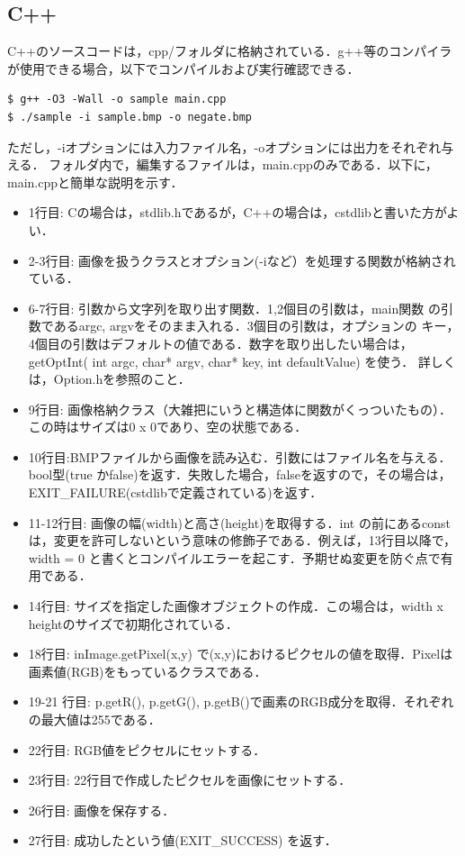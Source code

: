 ﻿\documentclass[11pt]{jsarticle}
\begin{document}
\subsection{C++}
C++のソースコードは，cpp/フォルダに格納されている．g++等のコンパイラが使用できる場合，以下でコンパイルおよび実行確認できる．
\begin{screen}
\begin{verbatim}
$ g++ -O3 -Wall -o sample main.cpp 
$ ./sample -i sample.bmp -o negate.bmp
\end{verbatim}
\end{screen}
ただし，-iオプションには入力ファイル名，-oオプションには出力をそれぞれ与える．
フォルダ内で，編集するファイルは，main.cppのみである．以下に，main.cppと簡単な説明を示す．

\begin{itemize}
\item 1行目: Cの場合は，stdlib.hであるが，C++の場合は，cstdlibと書いた方がよい．
\item 2-3行目: 画像を扱うクラスとオプション(-iなど）を処理する関数が格納されている．
\item 6-7行目: 引数から文字列を取り出す関数．1,2個目の引数は，main関数
  の引数であるargc, argvをそのまま入れる．3個目の引数は，オプションの
  キー，4個目の引数はデフォルトの値である．数字を取り出したい場合は，
  getOptInt( int argc, char* argv, char* key, int defaultValue) を使う．
  詳しくは，Option.hを参照のこと．
\item 9行目: 画像格納クラス（大雑把にいうと構造体に関数がくっついたもの）．この時はサイズは0 x 0であり、空の状態である．
\item 10行目:BMPファイルから画像を読み込む．引数にはファイル名を与える．bool型(true かfalse)を返す．失敗した場合，falseを返すので，その場合は，EXIT\_FAILURE(cstdlibで定義されている)を返す．
\item 11-12行目: 画像の幅(width)と高さ(height)を取得する．int の前にあるconstは，変更を許可しないという意味の修飾子である．例えば，13行目以降で， width = 0 と書くとコンパイルエラーを起こす．予期せぬ変更を防ぐ点で有用である．
\item 14行目: サイズを指定した画像オブジェクトの作成．この場合は，width x heightのサイズで初期化されている．
\item 18行目: inImage.getPixel(x,y) で(x,y)におけるピクセルの値を取得．Pixelは画素値(RGB)をもっているクラスである．
\item 19-21 行目: p.getR(), p.getG(), p.getB()で画素のRGB成分を取得．それぞれの最大値は255である．
\item 22行目: RGB値をピクセルにセットする．
\item 23行目: 22行目で作成したピクセルを画像にセットする．
\item 26行目: 画像を保存する．
\item 27行目: 成功したという値(EXIT\_SUCCESS) を返す．
\end{itemize}
\end{document}
